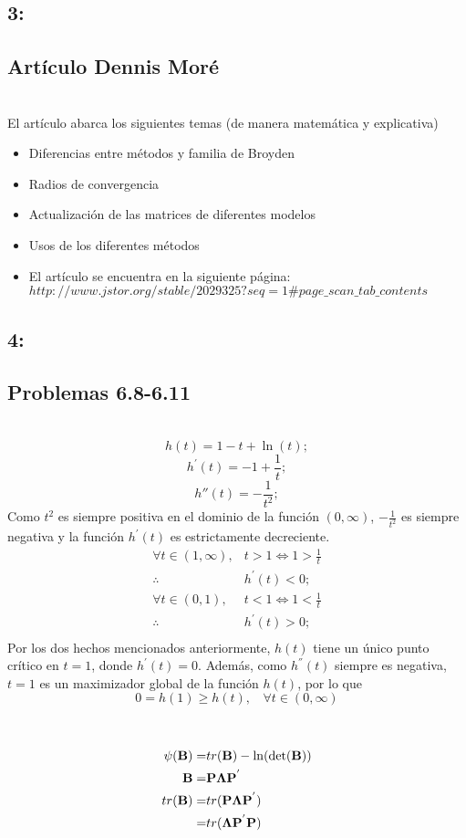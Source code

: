 \documentclass[12pt]{article}
\newcommand{\noi}{\noindent}
\newcommand{\beas}{\begin{eqnarray*}}
\newcommand{\eeas}{\end{eqnarray*}}
\begin{document}
\subsection*{3:}
\subsection*{Art\'iculo Dennis Mor\'e}
\noi\\
\noi El art\'iculo abarca los siguientes temas (de manera matem\'atica y explicativa)
\begin{itemize}
\item{Diferencias entre m\'etodos y familia de Broyden}
\item Radios de convergencia
\item Actualizaci\'on de las matrices de diferentes modelos
\item Usos de los diferentes m\'etodos
\item El art\'iculo se encuentra en la siguiente p\'agina: $http://www.jstor.org/stable/2029325?seq=1\#page\_scan\_tab\_contents$
\end{itemize}
\subsection*{4: }
\subsection*{Problemas 6.8-6.11}
\noi\\
\noi{\bf{6.8}}
$$h(t)= 1-t+\ln(t);$$ $$ h^{'}(t)=-1+\frac{1}{t};$$ $$h{''}(t)=-\frac{1}{t^{2}};$$
Como $t^{2}$ es siempre positiva en el dominio de la funci\'on $(0,\infty)$, $-\frac{1}{t^{2}}$ es siempre negativa y la funci\'on $h^{'}(t)$ es estrictamente decreciente. \\
\beas 
\forall t \in (1,\infty),& t > 1 \iff 1> \frac{1}{t} \\
\therefore &h^{'}(t) <  0;\\
\forall t \in (0,1), & t < 1 \iff  1 < \frac{1}{t} \\
\therefore &h^{'}(t) > 0; \\
\eeas
\noi Por los dos hechos mencionados anteriormente, $h(t)$ tiene un \'unico punto cr\'itico en $t=1$, donde $h^{'}(t)=0$. Adem\'as, como $h^{''}(t)$ siempre es negativa, $t=1$ es un maximizador global de la funci\'on $h(t)$, por lo que $$0 = h(1) \geq h(t) ,\ \ \ \  \forall t \in (0, \infty)$$\\ \\
\noi{\bf{6.9}}
 \beas
 \psi({\bf B})=&tr({\bf B}) - \ln(\det({\bf B}))\\
{\bf B}=&{\bf P}{\bf \Lambda}{\bf P^{'}}\\
tr({\bf B})=&tr({\bf P}{\bf \Lambda}{\bf P^{'}})\\
=&tr({\bf \Lambda}{\bf P^{'}}{\bf P})\\ \ \ \ 
\eeas
\end{document}

